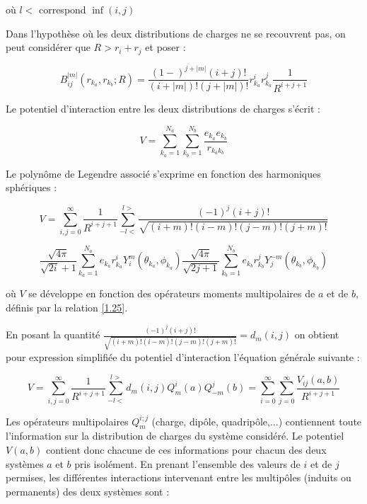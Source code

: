	\noindent où $l<$ correspond $\inf (i,j)$
	
	
	Dans l'hypothèse où les deux distributions de charges ne se recouvrent pas, on peut considérer que $R> r_{i} +r_{j}$ et poser : 
	
	\begin{equation}
	B_{ij}^{|m|}(r_{k_{a}}, r_{k_{b}}; R) = \frac{(1-)^{j+|m|} (i+j)!}{(i+|m|)! (j+|m|)!} r^{i}_{k_{a}} r_{k_{a}}^{j} \frac{1}{R^{i+j+1}}
	\end{equation}
	
	Le potentiel d'interaction entre les deux distributions de charges s'écrit : 
	
	\begin{equation}
	V = \sum_{k_{a}=1}^{N_{a}} \sum_{k_{b}=1}^{N_{b}} \frac{e_{k_{a}}e_{k_{b}}}{r_{k_{a}k_{b}}}
	\end{equation}
	
	
	Le polynôme de Legendre associé s'exprime en fonction des harmoniques sphériques : 
	
	\begin{equation}
	V = \sum_{i,j=0}^{\infty} \frac{1}{R^{i+j+1}} \sum_{-l<}^{l>} \frac{(-1)^{j} (i+j)!} {\sqrt{(i+m)! (i-m)! (j-m)! (j+m)!}}
	\end{equation}
	
	\begin{equation}
	\frac{\sqrt{4\pi}}{\sqrt{2i}+ 1} \sum_{k_{a}=1}^{N_{a}} e_{k_{a}} r_{k_{a}}^{i} Y_{i}^{m} (\theta_{k_{a}},\phi_{k_{a}}) \frac{\sqrt{4\pi}}{\sqrt{2j+ 1}} \sum_{k_{b}=1}^{N_{b}} e_{k_{b}}r_{k_{b}}^{j} Y_{j}^{-m}(\theta_{k_{b}},\phi_{k_{b}})
	\end{equation}
	
	\noindent où $V$ se développe en fonction des opérateurs moments multipolaires de $a$ et de $b$, définis par la relation \ref{1.25}.
	
	En posant la quantité $\frac{(-1)^{j} (i+j)!} {\sqrt{(i+m)! (i-m)! (j-m)! (j+m)!}}=d_{m}(i,j)$ on obtient pour expression simplifiée du potentiel d'interaction l'équation générale suivante : 
	
	\begin{equation}
	V = \sum_{i,j=0}^{\infty} \frac{1}{R^{i+j+1}} \sum_{-l<}^{l>} d_{m}(i,j) Q_{m}^{i}(a) Q_{-m}^{j} (b) = \sum_{i=0}^{\infty} \sum_{j=0}^{\infty} \frac{V_{ij}(a,b)}{R^{i+j+1}} \label{1.33}
	\end{equation}
	
	Les opérateurs multipolaires $Q_{m}^{i;j}$ (charge, dipôle, quadripôle,...) contiennent toute l'information sur la distribution de charges du système considéré. Le potentiel $V(a,b)$ contient donc chacune de ces informations pour chacun des deux systèmes $a$ et $b$ pris isolément. En prenant l'ensemble des valeurs de $i$ et de $j$ permises, les différentes interactions intervenant entre les multipôles (induits ou permanents) des deux systèmes sont :
	
